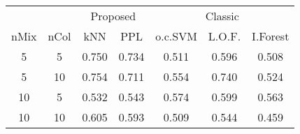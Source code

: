 
\begin{tabular}{ccccccc}
\toprule
\multicolumn{2}{c}{ } & \multicolumn{2}{c}{Proposed} & \multicolumn{3}{c}{Classic} \\
\cmidrule(l{3pt}r{3pt}){3-4} \cmidrule(l{3pt}r{3pt}){5-7}
nMix & nCol & kNN & PPL & o.c.SVM & L.O.F. & I.Forest\\
\midrule
5 & 5 & 0.750 & 0.734 & 0.511 & 0.596 & 0.508\\
5 & 10 & 0.754 & 0.711 & 0.554 & 0.740 & 0.524\\
10 & 5 & 0.532 & 0.543 & 0.574 & 0.599 & 0.563\\
10 & 10 & 0.605 & 0.593 & 0.509 & 0.544 & 0.459\\
\bottomrule
\end{tabular}